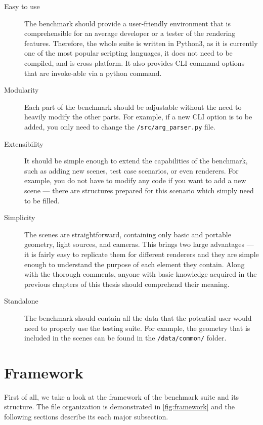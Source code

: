 \begin{description}
	\item[Easy to use] The benchmark should provide a user-friendly environment that is comprehensible for an average developer or a tester of the rendering features. Therefore, the whole suite is written in Python3, as it is currently one of the most popular scripting languages, it does not need to be compiled, and is cross-platform. It also provides CLI command options that are invoke-able via a python command.
	\item[Modularity] Each part of the benchmark should be adjustable without the need to heavily modify the other parts. For example, if a new CLI option is to be added, you only need to change the \texttt{/src/arg\_parser.py} file.
	\item[Extensibility] It should be simple enough to extend the capabilities of the benchmark, such as adding new scenes, test case scenarios, or even renderers. For example, you do not have to modify any code if you want to add a new scene --- there are structures prepared for this scenario which simply need to be filled.
	\item[Simplicity] The scenes are straightforward, containing only basic and portable geometry, light sources, and cameras. This brings two large advantages --- it is fairly easy to replicate them for different renderers and they are simple enough to understand the purpose of each element they contain. Along with the thorough comments, anyone with basic knowledge acquired in the previous chapters of this thesis should comprehend their meaning.
	\item[Standalone] The benchmark should contain all the data that the potential user would need to properly use the testing suite. For example, the geometry that is included in the scenes can be found in the \texttt{/data/common/} folder.
\end{description}

\section{Framework}

First of all, we take a look at the framework of the benchmark suite and its structure. The file organization is demonstrated in \autoref{fig:framework} and the following sections describe its each major subsection.

